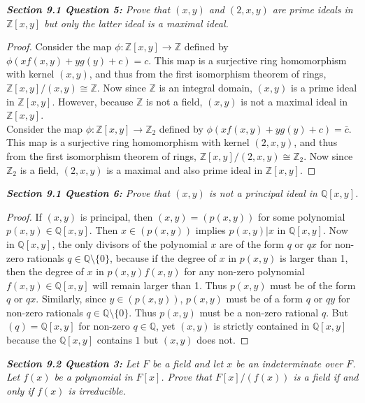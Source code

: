 \documentclass{article}
\begin{document}
\it \textbf{Section 9.1 Question 5:} Prove that $(x,y)$ and $(2,x,y)$ are
  prime ideals in $\mathbb{Z}[x,y]$ but only the latter ideal is a maximal
  ideal.

  \begin{proof}
    Consider the map $\phi:\mathbb{Z}[x,y]\rightarrow\mathbb{Z}$
    defined by $\phi(xf(x,y)+yg(y)+c)=c$. This map is a surjective ring
    homomorphism with kernel $(x,y)$, and thus from the first isomorphism
    theorem of rings, $\mathbb{Z}[x,y]/(x,y)\cong\mathbb{Z}$. Now since
    $\mathbb{Z}$ is an integral domain, $(x,y)$ is a prime ideal in
    $\mathbb{Z}[x,y]$. However, because $\mathbb{Z}$ is not a field,
    $(x,y)$ is not a maximal ideal in $\mathbb{Z}[x,y]$. \\

    Consider the map $\phi:\mathbb{Z}[x,y]\rightarrow\mathbb{Z}_2$
    defined by $\phi(xf(x,y)+yg(y)+c)=\bar{c}$. This map is a surjective ring
    homomorphism with kernel $(2,x,y)$, and thus from the first isomorphism
    theorem of rings, $\mathbb{Z}[x,y]/(2,x,y)\cong\mathbb{Z}_2$. Now since
    $\mathbb{Z}_2$ is a field, $(2,x,y)$ is a maximal and also prime ideal in
    $\mathbb{Z}[x,y]$.
  \end{proof}

\it \textbf{Section 9.1 Question 6:} Prove that $(x,y)$ is not a principal
  ideal in $\mathbb{Q}[x,y]$.

  \begin{proof}
    If $(x,y)$ is principal, then $(x,y)=(p(x,y))$ for some polynomial
    $p(x,y)\in\mathbb{Q}[x,y]$. Then $x\in(p(x,y))$ implies $p(x,y)|x$ in
    $\mathbb{Q}[x,y]$. Now in $\mathbb{Q}[x,y]$, the only divisors of the
    polynomial $x$ are of the form $q$ or $qx$ for non-zero rationals
    $q\in\mathbb{Q}\setminus\{0\}$, because if the degree of $x$ in
    $p(x,y)$ is larger than 1, then the degree of $x$ in $p(x,y)f(x,y)$ for
    any non-zero polynomial $f(x,y)\in\mathbb{Q}[x,y]$ will remain larger
    than 1. Thus $p(x,y)$ must be of the form $q$ or $qx$.  Similarly,
    since $y\in(p(x,y))$, $p(x,y)$ must be of a form $q$ or $qy$ for
    non-zero rationals $q\in\mathbb{Q}\setminus\{0\}$. Thus $p(x,y)$ must
    be a non-zero rational $q$. But $(q)=\mathbb{Q}[x,y]$ for non-zero
    $q\in\mathbb{Q}$, yet $(x,y)$ is strictly contained in
    $\mathbb{Q}[x,y]$ because the $\mathbb{Q}[x,y]$ contains $1$ but
    $(x,y)$ does not.
  \end{proof}

\it \textbf{Section 9.2 Question 3:} Let $F$ be a field and let $x$ be an
  indeterminate over $F$. Let $f(x)$ be a polynomial in $F[x]$. Prove that
  $F[x]/(f(x))$ is a field if and only if $f(x)$ is irreducible.
\end{document}
